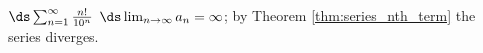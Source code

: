 {$\ds \sum_{n=1}^\infty \frac{n!}{10^n}$
}
{$\ds \lim_{n\to\infty}a_n = \infty$; by Theorem \ref{thm:series_nth_term} the series diverges.
}